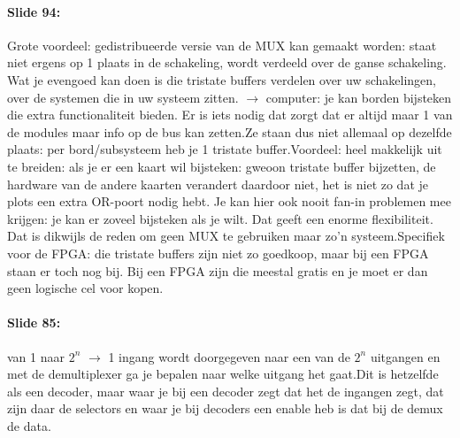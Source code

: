 \documentclass[10pt,a4paper]{book}
\begin{document}
\paragraph{Slide 94:} Grote voordeel: gedistribueerde versie van de MUX kan gemaakt worden: staat niet ergens op 1 plaats in de schakeling, wordt verdeeld over de ganse schakeling. Wat je evengoed kan doen is die tristate buffers verdelen over uw schakelingen, over de systemen die in uw systeem zitten. $\rightarrow$ computer: je kan borden bijsteken die extra functionaliteit bieden. Er is iets nodig dat zorgt dat er altijd maar 1 van de modules maar info op de bus kan zetten.Ze staan dus niet allemaal op dezelfde plaats: per bord/subsysteem heb je 1 tristate buffer.Voordeel: heel makkelijk uit te breiden: als je er een kaart wil bijsteken: gweoon tristate buffer bijzetten, de hardware van de andere kaarten verandert daardoor niet, het is niet zo dat je plots een extra OR-poort nodig hebt. Je kan hier ook nooit fan-in problemen mee krijgen: je kan er zoveel bijsteken als je wilt. Dat geeft een enorme flexibiliteit. Dat is dikwijls de reden om geen MUX te gebruiken maar zo'n systeem.Specifiek voor de FPGA: die tristate buffers zijn niet zo goedkoop, maar bij een FPGA staan er toch nog bij. Bij een FPGA zijn die meestal gratis en je moet er dan geen logische cel voor kopen.

\paragraph{Slide 85:} van 1 naar $2^n$ $\rightarrow$ 1 ingang wordt doorgegeven naar een van de $2^n$ uitgangen en met de demultiplexer ga je bepalen naar welke uitgang het gaat.Dit is hetzelfde als een decoder, maar waar je bij een decoder zegt dat het de ingangen zegt, dat zijn daar de selectors en waar je bij decoders een enable heb is dat bij de demux de data.
\end{document}
